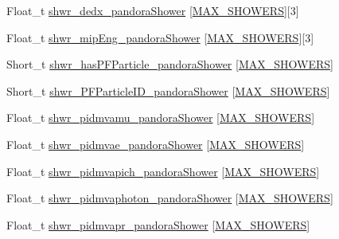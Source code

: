 \begin{DoxyCompactItemize}
Float\-\_\-t \hyperlink{classanatree_a3a42e2fe2e5adfe72264c997d3dcd3e2}{shwr\-\_\-dedx\-\_\-pandora\-Shower} \mbox{[}\hyperlink{anatree__core__v09410002_8h_aa8deaf72f1f7bd4b88c7d1ea07590801}{M\-A\-X\-\_\-\-S\-H\-O\-W\-E\-R\-S}\mbox{]}\mbox{[}3\mbox{]}
\item 
Float\-\_\-t \hyperlink{classanatree_ae6b7fcd44229e272075ada4d6f34a306}{shwr\-\_\-mip\-Eng\-\_\-pandora\-Shower} \mbox{[}\hyperlink{anatree__core__v09410002_8h_aa8deaf72f1f7bd4b88c7d1ea07590801}{M\-A\-X\-\_\-\-S\-H\-O\-W\-E\-R\-S}\mbox{]}\mbox{[}3\mbox{]}
\item 
Short\-\_\-t \hyperlink{classanatree_a2e0ab3cd5998fa43f03bd283045f16cb}{shwr\-\_\-has\-P\-F\-Particle\-\_\-pandora\-Shower} \mbox{[}\hyperlink{anatree__core__v09410002_8h_aa8deaf72f1f7bd4b88c7d1ea07590801}{M\-A\-X\-\_\-\-S\-H\-O\-W\-E\-R\-S}\mbox{]}
\item 
Short\-\_\-t \hyperlink{classanatree_a84a70923c4d34f2da5980918acede4e3}{shwr\-\_\-\-P\-F\-Particle\-I\-D\-\_\-pandora\-Shower} \mbox{[}\hyperlink{anatree__core__v09410002_8h_aa8deaf72f1f7bd4b88c7d1ea07590801}{M\-A\-X\-\_\-\-S\-H\-O\-W\-E\-R\-S}\mbox{]}
\item 
Float\-\_\-t \hyperlink{classanatree_a80b33626a94f584d54626d253a7c1bc3}{shwr\-\_\-pidmvamu\-\_\-pandora\-Shower} \mbox{[}\hyperlink{anatree__core__v09410002_8h_aa8deaf72f1f7bd4b88c7d1ea07590801}{M\-A\-X\-\_\-\-S\-H\-O\-W\-E\-R\-S}\mbox{]}
\item 
Float\-\_\-t \hyperlink{classanatree_aa39c78ac7531058cd6a1d22798ce14c5}{shwr\-\_\-pidmvae\-\_\-pandora\-Shower} \mbox{[}\hyperlink{anatree__core__v09410002_8h_aa8deaf72f1f7bd4b88c7d1ea07590801}{M\-A\-X\-\_\-\-S\-H\-O\-W\-E\-R\-S}\mbox{]}
\item 
Float\-\_\-t \hyperlink{classanatree_aed38e8072ec8401c9df86350510a5d4c}{shwr\-\_\-pidmvapich\-\_\-pandora\-Shower} \mbox{[}\hyperlink{anatree__core__v09410002_8h_aa8deaf72f1f7bd4b88c7d1ea07590801}{M\-A\-X\-\_\-\-S\-H\-O\-W\-E\-R\-S}\mbox{]}
\item 
Float\-\_\-t \hyperlink{classanatree_a93ee46cef18ccf358e65be911c7e4d91}{shwr\-\_\-pidmvaphoton\-\_\-pandora\-Shower} \mbox{[}\hyperlink{anatree__core__v09410002_8h_aa8deaf72f1f7bd4b88c7d1ea07590801}{M\-A\-X\-\_\-\-S\-H\-O\-W\-E\-R\-S}\mbox{]}
\item 
Float\-\_\-t \hyperlink{classanatree_a465d1af7df49511e91ebd79f398816b0}{shwr\-\_\-pidmvapr\-\_\-pandora\-Shower} \mbox{[}\hyperlink{anatree__core__v09410002_8h_aa8deaf72f1f7bd4b88c7d1ea07590801}{M\-A\-X\-\_\-\-S\-H\-O\-W\-E\-R\-S}\mbox{]}
\item 

\end{DoxyCompactItemize}
